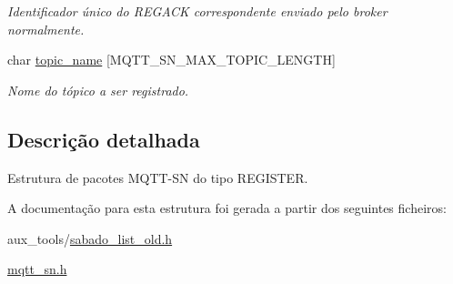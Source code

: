 \begin{DoxyCompactItemize}
\begin{DoxyCompactList}\small\item\em Identificador único do R\+E\+G\+A\+C\+K correspondente enviado pelo broker normalmente. \end{DoxyCompactList}\item 
\hypertarget{group__Pacotes_ga4928dc5635290abe481ce340f6d47865}{char \hyperlink{group__Pacotes_ga4928dc5635290abe481ce340f6d47865}{topic\+\_\+name} \mbox{[}M\+Q\+T\+T\+\_\+\+S\+N\+\_\+\+M\+A\+X\+\_\+\+T\+O\+P\+I\+C\+\_\+\+L\+E\+N\+G\+T\+H\mbox{]}}\label{group__Pacotes_ga4928dc5635290abe481ce340f6d47865}

\begin{DoxyCompactList}\small\item\em Nome do tópico a ser registrado. \end{DoxyCompactList}\end{DoxyCompactItemize}


\subsection{Descrição detalhada}
Estrutura de pacotes M\+Q\+T\+T-\/\+S\+N do tipo R\+E\+G\+I\+S\+T\+E\+R. 

A documentação para esta estrutura foi gerada a partir dos seguintes ficheiros\+:\begin{DoxyCompactItemize}
\item 
aux\+\_\+tools/\hyperlink{sabado__list__old_8h}{sabado\+\_\+list\+\_\+old.\+h}\item 
\hyperlink{mqtt__sn_8h}{mqtt\+\_\+sn.\+h}\end{DoxyCompactItemize}
